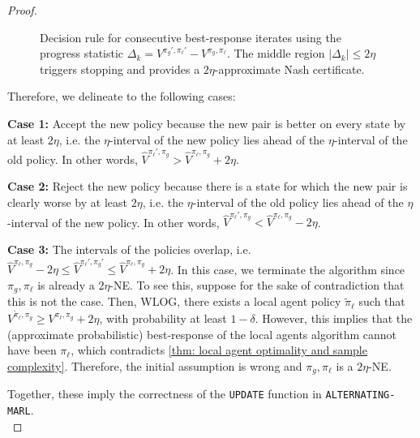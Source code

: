 \documentclass{article}
\theoremstyle{plain}
\theoremstyle{definition}
\begin{document}
\begin{proof}
\begin{figure}[t]
\begin{tikzpicture}
\end{tikzpicture}
\caption{Decision rule for consecutive best-response iterates using the progress statistic
$\Delta_k = V^{\pi_g',\pi_\ell'} - V^{\pi_g,\pi_\ell}$. The middle region $|\Delta_k|\le2\eta$ triggers stopping and provides a $2\eta$-approximate Nash certificate. }
\end{figure}





Therefore, we delineate to the following cases:



\textbf{Case 1:} Accept the new policy because the new pair is better on every state by at least $2\eta$, i.e. the $\eta$-interval of the new policy lies ahead of the $\eta$-interval of the old policy. In other words, $\hat{V}^{\pi_\ell',\pi_g} > 
\hat{V}^{\pi_\ell,\pi_g} + 2\eta$.


  \textbf{Case 2:} Reject the new policy because there is a state for which the new pair is clearly worse by at least $2\eta$, i.e. the $\eta$-interval of the old policy lies ahead of the $\eta$-interval of the new policy.  In other words, $\hat{V}^{\pi_\ell',\pi_g} < \hat{V}^{\pi_\ell,\pi_g} - 2\eta$.

  
   \textbf{Case 3:} The intervals of the policies overlap, i.e. $\hat{V}^{\pi_\ell,\pi_g} - 2\eta \leq \hat{V}^{\pi_\ell',\pi_g'} \leq \hat{V}^{\pi_\ell,\pi_g} + 2\eta$. In this case, we terminate the algorithm since $\pi_g, \pi_\ell$ is already a $2\eta$-NE. To see this, suppose for the sake of contradiction that this is not the case. Then, WLOG, there exists a local agent policy $\tilde{\pi}_\ell$ such that $V^{\tilde{\pi}_\ell,\pi_g} \geq V^{\pi_\ell,\pi_g} + 2\eta$, with probability at least $1-\delta$. However, this implies that the (approximate probabilistic) best-response of the local agents algorithm cannot have been $\pi_\ell$, which contradicts \cref{thm: local agent optimality and sample complexity}. Therefore, the initial assumption is wrong and $\pi_g, \pi_\ell$ is a $2\eta$-NE.

   Together, these imply the correctness of the \texttt{UPDATE} function in \texttt{ALTERNATING-MARL}.\qedhere\\
\end{proof} 
\end{document}
